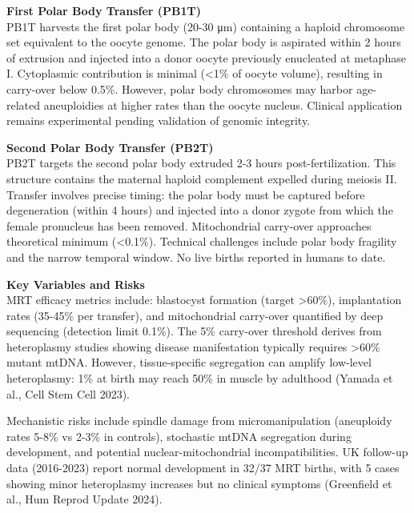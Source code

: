 \begin{technical}
\textbf{First Polar Body Transfer (PB1T)}\\
PB1T harvests the first polar body (20-30 μm) containing a haploid chromosome set equivalent to the oocyte genome. The polar body is aspirated within 2 hours of extrusion and injected into a donor oocyte previously enucleated at metaphase I. Cytoplasmic contribution is minimal (<1\% of oocyte volume), resulting in carry-over below 0.5\%. However, polar body chromosomes may harbor age-related aneuploidies at higher rates than the oocyte nucleus. Clinical application remains experimental pending validation of genomic integrity.

\textbf{Second Polar Body Transfer (PB2T)}\\
PB2T targets the second polar body extruded 2-3 hours post-fertilization. This structure contains the maternal haploid complement expelled during meiosis II. Transfer involves precise timing: the polar body must be captured before degeneration (within 4 hours) and injected into a donor zygote from which the female pronucleus has been removed. Mitochondrial carry-over approaches theoretical minimum (<0.1\%). Technical challenges include polar body fragility and the narrow temporal window. No live births reported in humans to date.

\textbf{Key Variables and Risks}\\
MRT efficacy metrics include: blastocyst formation (target >60\%), implantation rates (35-45\% per transfer), and mitochondrial carry-over quantified by deep sequencing (detection limit 0.1\%). The 5\% carry-over threshold derives from heteroplasmy studies showing disease manifestation typically requires >60\% mutant mtDNA. However, tissue-specific segregation can amplify low-level heteroplasmy: 1\% at birth may reach 50\% in muscle by adulthood (Yamada et al., Cell Stem Cell 2023).

Mechanistic risks include spindle damage from micromanipulation (aneuploidy rates 5-8\% vs 2-3\% in controls), stochastic mtDNA segregation during development, and potential nuclear-mitochondrial incompatibilities. UK follow-up data (2016-2023) report normal development in 32/37 MRT births, with 5 cases showing minor heteroplasmy increases but no clinical symptoms (Greenfield et al., Hum Reprod Update 2024).

\end{technical}
